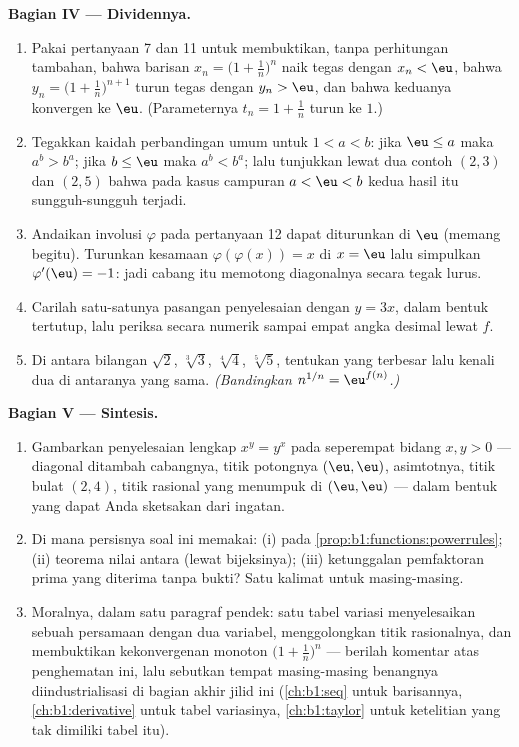 \begin{problem}
\medskip
\noindent\textbf{Bagian IV --- Dividennya.}
\begin{enumerate}[resume]
  \item Pakai pertanyaan 7 dan 11 untuk membuktikan, tanpa perhitungan
        tambahan, bahwa barisan $x_n = \bigl(1 +
        \frac1n\bigr)^n$ naik tegas dengan $x_n < \eu$,
        bahwa $y_n = \bigl(1 + \frac1n\bigr)^{n+1}$ turun
        tegas dengan $y_n > \eu$, dan bahwa keduanya konvergen ke
        $\eu$. (Parameternya $t_n = 1 + \frac1n$ turun ke
        $1$.)
  \item Tegakkan kaidah perbandingan umum untuk $1 < a < b$:
        jika $\eu \leq a$ maka $a^b > b^a$; jika $b \leq \eu$ maka
        $a^b < b^a$; lalu tunjukkan lewat dua contoh $(2, 3)$ dan
        $(2, 5)$ bahwa pada kasus campuran $a < \eu < b$ kedua
        hasil itu sungguh-sungguh terjadi.
  \item Andaikan involusi $\varphi$ pada pertanyaan 12 dapat
        diturunkan di $\eu$ (memang begitu). Turunkan
        kesamaan $\varphi(\varphi(x)) = x$ di $x = \eu$ lalu simpulkan
        $\varphi'(\eu) = -1$: jadi cabang itu memotong diagonalnya
        secara tegak lurus.
  \item Carilah satu-satunya pasangan penyelesaian dengan $y = 3x$, dalam bentuk
        tertutup, lalu periksa secara numerik sampai empat angka desimal lewat $f$.
  \item Di antara bilangan $\sqrt2$, $\sqrt[3]3$, $\sqrt[4]4$,
        $\sqrt[5]5$, tentukan yang terbesar lalu kenali dua di antaranya
        yang sama. \emph{(Bandingkan $n^{1/n} =
        \eu^{f(n)}$.)}
\end{enumerate}

\medskip
\noindent\textbf{Bagian V --- Sintesis.}
\begin{enumerate}[resume]
  \item Gambarkan  penyelesaian lengkap $x^y = y^x$ pada
        seperempat bidang $x, y > 0$ --- diagonal ditambah cabangnya, titik
        potongnya $(\eu, \eu)$, asimtotnya, titik bulat
        $(2, 4)$, titik rasional yang menumpuk di
        $(\eu, \eu)$ --- dalam bentuk yang dapat Anda sketsakan dari ingatan.
  \item Di mana persisnya soal ini memakai: (i)  pada \cref{prop:b1:functions:powerrules}; (ii)
        teorema nilai antara (lewat 
        bijeksinya); (iii) ketunggalan pemfaktoran prima yang
        diterima tanpa bukti? Satu kalimat untuk masing-masing.
  \item Moralnya, dalam satu paragraf pendek: satu tabel variasi
        menyelesaikan sebuah persamaan dengan dua variabel, menggolongkan titik
        rasionalnya, dan membuktikan kekonvergenan monoton
        $\bigl(1 + \frac1n\bigr)^n$ --- berilah komentar atas penghematan ini,
        lalu sebutkan tempat masing-masing benangnya diindustrialisasi di bagian
        akhir jilid ini (\cref{ch:b1:seq} untuk barisannya,
        \cref{ch:b1:derivative} untuk tabel variasinya,
        \cref{ch:b1:taylor} untuk ketelitian yang tak dimiliki tabel itu).

\end{enumerate}
\end{problem}
